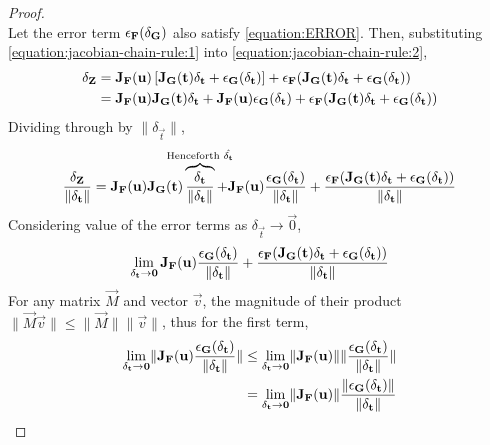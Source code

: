 \begin{lemma}
\begin{proof}
\begin{equation}
        \end{equation}
        Let the error term $\epsilon_{\mathbf{F}}(\delta_{\mathbf{G}})$ also satisfy \eqref{equation:ERROR}. Then, substituting \eqref{equation:jacobian-chain-rule:1} into \eqref{equation:jacobian-chain-rule:2},
        \begin{align*}
            \delta_{\mathbf{Z}}&=\mathbf{J}_{\mathbf{F}}(\mathbf{u})\left[\mathbf{J}_{\mathbf{G}}(\mathbf{t})\delta_{\mathbf{t}}+\epsilon_{\mathbf{G}}(\delta_{\mathbf{t}})\right]+\epsilon_{\mathbf{F}}(\mathbf{J}_{\mathbf{G}}(\mathbf{t})\delta_{\mathbf{t}}+\epsilon_{\mathbf{G}}(\delta_{\mathbf{t}}))\\
            &=\mathbf{J}_{\mathbf{F}}(\mathbf{u})\mathbf{J}_{\mathbf{G}}(\mathbf{t})\delta_{\mathbf{t}}+\mathbf{J}_{\mathbf{F}}(\mathbf{u})\epsilon_{\mathbf{G}}(\delta_{\mathbf{t}})+\epsilon_{\mathbf{F}}(\mathbf{J}_{\mathbf{G}}(\mathbf{t})\delta_{\mathbf{t}}+\epsilon_{\mathbf{G}}(\delta_{\mathbf{t}}))
        \end{align*}
        Dividing through by $\lVert\delta_\vec{t}\rVert$,
        $$
            \frac{\delta_\vec{Z}}{\lVert\delta_\vec{t}\rVert}=\jacobian_\fatf(\vec{u})\jacobian_\vec{G}(\vec{t})\overbrace{\frac{\delta_\vec{t}}{\lVert\delta_\vec{t}\rVert}}^{\text{\makebox[0pt]{Henceforth $\hat{\delta_\vec{t}}$}}}+\jacobian_\fatf(\vec{u})\frac{\epsilon_\vec{G}(\delta_\vec{t})}{\lVert\delta_\vec{t}\rVert}+\frac{\epsilon_\fatf(\jacobian_\vec{G}(\vec{t})\delta_\vec{t}+\epsilon_\vec{G}(\delta_\vec{t}))}{\lVert\delta_\vec{t}\rVert}
        $$
        Considering value of the error terms as $\delta_\vec{t}\rightarrow\vec{0}$,
        $$
            \lim_{\delta_{\mathbf{t}}\rightarrow\mathbf{0}}\mathbf{J}_{\mathbf{F}}(\mathbf{u})\frac{\epsilon_{\mathbf{G}}(\delta_{\mathbf{t}})}{\lVert\delta_{\mathbf{t}}\rVert}+\frac{\epsilon_{\mathbf{F}}(\mathbf{J}_{\mathbf{G}}(\mathbf{t})\delta_{\mathbf{t}}+\epsilon_{\mathbf{G}}(\delta_{\mathbf{t}}))}{\lVert\delta_{\mathbf{t}}\rVert}
        $$
        For any matrix $\vec{M}$ and vector $\vec{v}$, the magnitude of their product $\lVert\vec{M}\vec{v}\rVert\leq\lVert\vec{M}\rVert\lVert\vec{v}\rVert$, thus for the first term,
        \begin{align*}
            \lim_{\delta_{\mathbf{t}}\rightarrow\mathbf{0}}\lVert\mathbf{J}_{\mathbf{F}}(\mathbf{u})\frac{\epsilon_{\mathbf{G}}(\delta_{\mathbf{t}})}{\lVert\delta_{\mathbf{t}}\rVert}\rVert&\leq\lim_{\delta_{\mathbf{t}}\rightarrow\mathbf{0}}\lVert\mathbf{J}_{\mathbf{F}}(\mathbf{u})\rVert\lVert\frac{\epsilon_{\mathbf{G}}(\delta_{\mathbf{t}})}{\lVert\delta_{\mathbf{t}}\rVert}\rVert\\
            &=\lim_{\delta_{\mathbf{t}}\rightarrow\mathbf{0}}\lVert\mathbf{J}_{\mathbf{F}}(\mathbf{u})\rVert\frac{\lVert\epsilon_{\mathbf{G}}(\delta_{\mathbf{t}})\rVert}{\lVert\delta_{\mathbf{t}}\rVert}
        \end{align*}

\end{proof}
\end{lemma}
